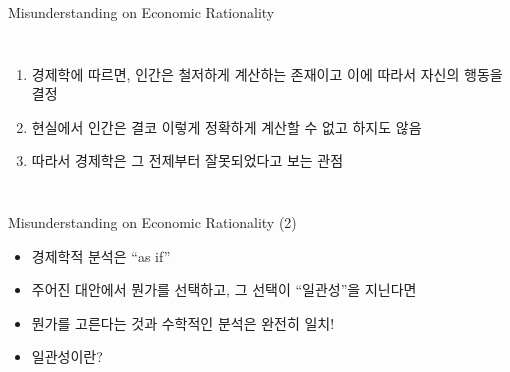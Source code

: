 \documentclass[final]{beamer}
\begin{document}
\begin{frame}[t]{Misunderstanding on Economic Rationality}
	\begin{columns}[c]
	\column{18em}
	\begin{enumerate}
		\item 경제학에 따르면, 인간은 철저하게 계산하는 존재이고 이에 따라서 자신의 행동을 결정
		\item 현실에서 인간은 결코 이렇게 정확하게 계산할 수 없고 하지도 않음
		\item 따라서 경제학은 그 전제부터 잘못되었다고 보는 관점
	\end{enumerate}
	\column{12em}
	\end{columns}
\end{frame}

\begin{frame}[t]{Misunderstanding on Economic Rationality (2)}
	\begin{itemize}
		\item 경제학적 분석은 ``as if'' 
		\item 주어진 대안에서 뭔가를 선택하고, 그 선택이 ``일관성''을 지닌다면 
		\item 뭔가를 고른다는 것과 수학적인 분석은 완전히 일치!
		\item 일관성이란?\\[1em]
	\end{itemize}
\end{frame}
\end{document}
